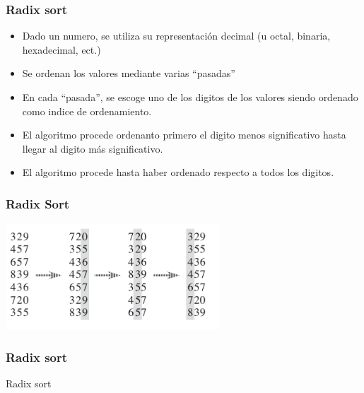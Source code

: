 \documentclass{beamer}
\begin{document}
\begin{frame}
    \frametitle{Radix sort}
    \begin{itemize}
        \item{Dado un numero, se utiliza su representaci\'on decimal
        (u octal, binaria, hexadecimal, ect.)}
        \item{Se ordenan los valores mediante varias ``pasadas''}
        \item{En cada ``pasada'', se escoge uno de los digitos de los
        valores siendo ordenado como indice de ordenamiento.}
        \item{El algoritmo procede ordenanto primero el digito menos
        significativo hasta llegar al digito m\'as significativo.}
        \item{El algoritmo procede hasta haber ordenado respecto
        a todos los digitos.}
    \end{itemize}
\end{frame}

\begin{frame}
    \frametitle{Radix Sort}
    \begin{center}
    \includegraphics[width=8cm]{./radix.png}
    \end{center}
\end{frame}

\begin{frame}
    \frametitle{Radix sort}
    \begin{algorithm}[H]
        \caption{Radix sort}
        \begin{algorithmic}[1]
        \EndFor
        \EndProcedure
        \end{algorithmic}
    \end{algorithm}
\end{frame}
\end{document}
